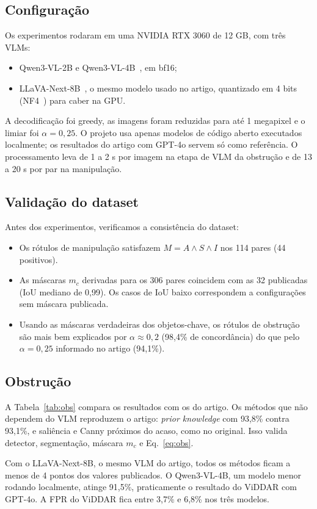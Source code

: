 \documentclass[journal,onecolumn]{IEEEtran}
\begin{document}
\subsection{Configuração}
Os experimentos rodaram em uma NVIDIA RTX 3060 de 12 GB, com três VLMs:
\begin{itemize}
\item Qwen3-VL-2B e Qwen3-VL-4B~\cite{qwen3vl}, em bf16;
\item LLaVA-Next-8B~\cite{llava}, o mesmo modelo usado no artigo, quantizado em 4 bits
  (NF4~\cite{qlora}) para caber na GPU.
\end{itemize}
A decodificação foi greedy, as imagens foram reduzidas para até 1 megapixel e o limiar foi
$\alpha=0{,}25$. O projeto usa apenas modelos de código aberto executados localmente; os resultados do
artigo com GPT-4o servem só como referência. O processamento leva de 1
a 2 s por imagem na etapa de VLM da obstrução e de 13 a 20 s por par na manipulação.

\subsection{Validação do dataset}
Antes dos experimentos, verificamos a consistência do dataset:
\begin{itemize}
\item Os rótulos de manipulação satisfazem $M=A\wedge S\wedge I$ nos 114 pares (44 positivos).
\item As máscaras $m_c$ derivadas para os 306 pares coincidem com as 32 publicadas (IoU mediano de
  0,99). Os casos de IoU baixo correspondem a configurações sem máscara publicada.
\item Usando as máscaras verdadeiras dos objetos-chave, os rótulos de obstrução são mais bem
  explicados por $\alpha\approx 0{,}2$ (98,4\% de concordância) do que pelo $\alpha=0{,}25$ informado
  no artigo (94,1\%).
\end{itemize}

\subsection{Obstrução}
A Tabela~\ref{tab:obs} compara os resultados com os do artigo. Os métodos que não dependem do VLM
reproduzem o artigo: \emph{prior knowledge} com 93,8\% contra 93,1\%, e saliência e Canny próximos
do acaso, como no original. Isso valida detector, segmentação, máscara $m_c$ e Eq.~\eqref{eq:obs}.

Com o LLaVA-Next-8B, o mesmo VLM do artigo, todos os métodos ficam a menos de 4 pontos dos valores
publicados. O Qwen3-VL-4B, um modelo menor rodando localmente, atinge 91,5\%, praticamente o
resultado do ViDDAR com GPT-4o. A FPR do ViDDAR fica entre 3,7\% e 6,8\% nos três modelos.
\end{document}
